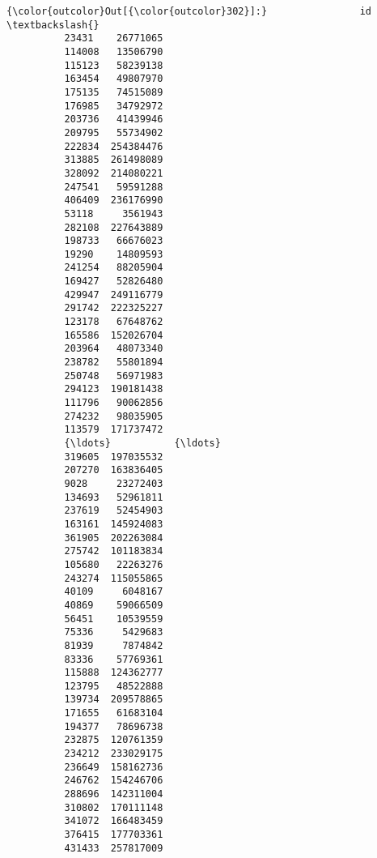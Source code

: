 \documentclass[11pt]{article}
\begin{document}
\begin{Verbatim}[commandchars=\\\{\}]
{\color{outcolor}Out[{\color{outcolor}302}]:}                id  \textbackslash{}
          23431    26771065   
          114008   13506790   
          115123   58239138   
          163454   49807970   
          175135   74515089   
          176985   34792972   
          203736   41439946   
          209795   55734902   
          222834  254384476   
          313885  261498089   
          328092  214080221   
          247541   59591288   
          406409  236176990   
          53118     3561943   
          282108  227643889   
          198733   66676023   
          19290    14809593   
          241254   88205904   
          169427   52826480   
          429947  249116779   
          291742  222325227   
          123178   67648762   
          165586  152026704   
          203964   48073340   
          238782   55801894   
          250748   56971983   
          294123  190181438   
          111796   90062856   
          274232   98035905   
          113579  171737472   
          {\ldots}           {\ldots}   
          319605  197035532   
          207270  163836405   
          9028     23272403   
          134693   52961811   
          237619   52454903   
          163161  145924083   
          361905  202263084   
          275742  101183834   
          105680   22263276   
          243274  115055865   
          40109     6048167   
          40869    59066509   
          56451    10539559   
          75336     5429683   
          81939     7874842   
          83336    57769361   
          115888  124362777   
          123795   48522888   
          139734  209578865   
          171655   61683104   
          194377   78696738   
          232875  120761359   
          234212  233029175   
          236649  158162736   
          246762  154246706   
          288696  142311004   
          310802  170111148   
          341072  166483459   
          376415  177703361   
          431433  257817009   
          

\end{Verbatim}
\end{document}
